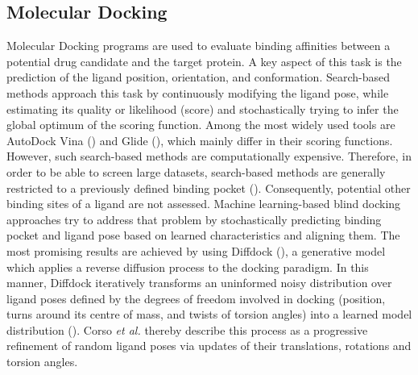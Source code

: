 \documentclass[11pt, letterpaper, titlepage]{article}
\begin{document}
\subsection{Molecular Docking}
Molecular Docking programs are used to evaluate binding affinities between a potential drug candidate and the target protein. A key aspect of this task is the prediction of the ligand position, orientation, and conformation. Search-based methods approach this task by continuously modifying the ligand pose, while estimating its quality or likelihood (score) and stochastically trying to infer the global optimum of the scoring function. Among the most widely used tools are AutoDock Vina (\cite{Trott.2010}) and Glide (\cite{Halgren.2004}), which mainly differ in their scoring functions. However, such search-based methods are computationally expensive. Therefore, in order to be able to screen large datasets, search-based methods are generally restricted to a previously defined binding pocket (\cite{Corso.2022}). Consequently, potential other binding sites of a ligand are not assessed. Machine learning-based blind docking approaches try to address that problem by stochastically predicting binding pocket and ligand pose based on learned characteristics and aligning them. The most promising results are achieved by using Diffdock (\cite{Corso.2022}), a generative model which applies a reverse diffusion process to the docking paradigm. In this manner, Diffdock iteratively transforms an uninformed noisy distribution over ligand poses defined by the degrees of freedom involved in docking (position, turns around its centre of mass, and twists of torsion angles) into a learned model distribution (\cite{Corso.2022}). Corso \textit{et al.} thereby describe this process as a progressive refinement of random ligand poses via updates of their translations, rotations and torsion angles.

\end{document}
